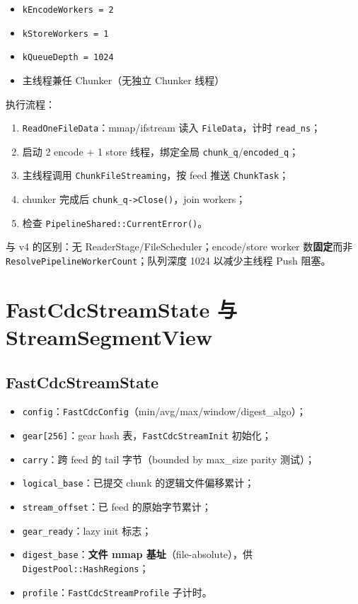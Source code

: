 \begin{structbox}
\begin{itemize}[nosep]
  \item \texttt{kEncodeWorkers = 2}
  \item \texttt{kStoreWorkers = 1}
  \item \texttt{kQueueDepth = 1024}
  \item 主线程兼任 Chunker（无独立 Chunker 线程）
\end{itemize}
\end{structbox}

执行流程：
\begin{enumerate}
  \item \texttt{ReadOneFileData}：mmap/ifstream 读入 \texttt{FileData}，计时 \texttt{read\_ns}；
  \item 启动 2 encode + 1 store 线程，绑定全局 \texttt{chunk\_q}/\texttt{encoded\_q}；
  \item 主线程调用 \texttt{ChunkFileStreaming}，按 feed 推送 \texttt{ChunkTask}；
  \item chunker 完成后 \texttt{chunk\_q->Close()}，join workers；
  \item 检查 \texttt{PipelineShared::CurrentError()}。
\end{enumerate}

与 v4 的区别：无 ReaderStage/FileScheduler；encode/store worker 数\textbf{固定}而非 \texttt{ResolvePipelineWorkerCount}；队列深度 1024 以减少主线程 Push 阻塞。

\section{FastCdcStreamState 与 StreamSegmentView}

\subsection{FastCdcStreamState}

\begin{structbox}[FastCdcStreamState 字段]
\begin{itemize}[nosep]
  \item \texttt{config}：\texttt{FastCdcConfig}（min/avg/max/window/digest\_algo）；
  \item \texttt{gear[256]}：gear hash 表，\texttt{FastCdcStreamInit} 初始化；
  \item \texttt{carry}：跨 feed 的 tail 字节（bounded by max\_size parity 测试）；
  \item \texttt{logical\_base}：已提交 chunk 的逻辑文件偏移累计；
  \item \texttt{stream\_offset}：已 feed 的原始字节累计；
  \item \texttt{gear\_ready}：lazy init 标志；
  \item \texttt{digest\_base}：\textbf{文件 mmap 基址}（file-absolute），供 \texttt{DigestPool::HashRegions}；
  \item \texttt{profile}：\texttt{FastCdcStreamProfile} 子计时。
\end{itemize}
\end{structbox}

